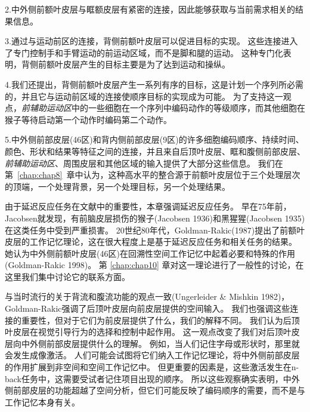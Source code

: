 2.中外侧前额叶皮层与眶额皮层有紧密的连接\cite{barbas1989architecture}，因此能够获取与当前需求相关的结果信息。
\par


3.通过与运动前区的连接，背侧前额叶皮层可以促进目标的实现。
这些连接进入了专门控制手和手臂运动的前运动区域，而不是脚和腿的运动。
这种专门化表明，背侧前额叶皮层产生的目标主要是为了达到运动和操纵。
\par


4.我们还提出，背侧前额叶皮层产生一系列有序的目标，这是计划一个序列所必需的，并且它与运动前区域的连接使顺序目标的实现成为可能。
为了支持这一观点，\textit{前辅助运动区}中的一些细胞在一个序列中编码动作的等级顺序\cite{shima2000neuronal}，而其他细胞在猴子等待启动第一个动作时编码第二个动作\cite{nakajima2009covert}。
\par


5.中外侧前部皮层(46区)和背内侧前部皮层(9区)的许多细胞编码顺序、持续时间、颜色、形状和结果等特征之间的连接，并且来自后顶叶皮层、眶和腹侧前部皮层、\textit{前辅助运动区}、周围皮层和其他区域的输入提供了大部分这些信息。
我们在第~\ref{chap:chap8}~章中认为，这种高水平的整合源于前额叶皮层位于三个处理层次的顶端，一个处理背景，另一个处理目标，另一个处理结果。


由于延迟反应任务在文献中的重要性，本章强调延迟反应任务。
早在75年前，Jacobsen就发现，有前脑皮层损伤的猴子(Jacobsen 1936)和黑猩猩(Jacobsen 1935)在这类任务中受到严重损害。
20世纪80年代，Goldman-Rakic(1987)提出了前额叶皮层的工作记忆理论，这在很大程度上是基于延迟反应任务和相关任务的结果。
她认为中外侧前额叶皮层(46区)在回溯性空间工作记忆中起着必要和特殊的作用(Goldman-Rakic 1998)。
第 \ref{chap:chap10} 章对这一理论进行了一般性的讨论，在这里我们集中讨论它的联系方面。


与当时流行的关于背流和腹流功能的观点一致(Ungerleider \& Mishkin 1982)， Goldman-Rakic强调了后顶叶皮层向前皮层提供的空间输入\cite{wilson1993dissociation}。
我们也强调这些连接的重要性，但对于它们为前皮层提供了什么，我们的解释不同。
我们认为后顶叶皮层在视觉引导行为的选择和控制中起作用\cite{shadmehr2004computational,milner2006visual}。
这一观点改变了我们对后顶叶皮层向中外侧前部皮层提供什么的理解\cite{rushworth2000anatomical}。
例如，当人们记住字母或形状时，那里就会发生成像激活\cite{rushworth1998functional}。
人们可能会试图将它们纳入工作记忆理论，将中外侧前部皮层的作用扩展到非空间和空间工作记忆中。
但更重要的因素是，这些激活发生在n-back任务中，这需要受试者记住项目出现的顺序\cite{nystrom2000working}。
所以这些观察确实表明，中外侧前部皮层的功能超越了空间分析，但它们可能反映了编码顺序的需要，而不是与工作记忆本身有关。



